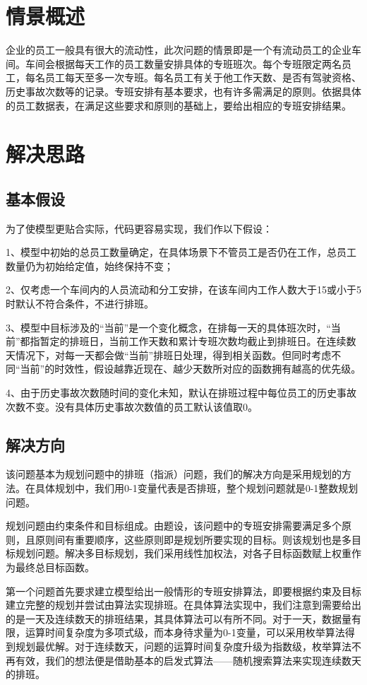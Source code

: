 \documentclass{article}
\begin{document}
	\newpage
	\section{情景概述}
	企业的员工一般具有很大的流动性，此次问题的情景即是一个有流动员工的企业车间。车间会根据每天工作的员工数量安排具体的专班班次。每个专班限定两名员工，每名员工每天至多一次专班。每名员工有关于他工作天数、是否有驾驶资格、历史事故次数等的记录。专班安排有基本要求，也有许多需满足的原则。依据具体的员工数据表，在满足这些要求和原则的基础上，要给出相应的专班安排结果。
	\section{解决思路}
	\subsection{基本假设}
	为了使模型更贴合实际，代码更容易实现，我们作以下假设：
	
	1、模型中初始的总员工数量确定，在具体场景下不管员工是否仍在工作，总员工数量仍为初始给定值，始终保持不变；
	
	2、仅考虑一个车间内的人员流动和分工安排，在该车间内工作人数大于15或小于5时默认不符合条件，不进行排班。
	
	3、模型中目标涉及的“当前”是一个变化概念，在排每一天的具体班次时，“当前”都指暂定的排班日，当前工作天数和累计专班次数均截止到排班日。在连续数天情况下，对每一天都会做“当前”排班日处理，得到相关函数。但同时考虑不同“当前”的时效性，假设越靠近现在、越少天数所对应的函数拥有越高的优先级。
	
	4、由于历史事故次数随时间的变化未知，默认在排班过程中每位员工的历史事故次数不变。没有具体历史事故次数值的员工默认该值取0。
	\subsection{解决方向}
	该问题基本为规划问题中的排班（指派）问题，我们的解决方向是采用规划的方法。在具体规划中，我们用0-1变量代表是否排班，整个规划问题就是0-1整数规划问题。
	
	规划问题由约束条件和目标组成。由题设，该问题中的专班安排需要满足多个原则，且原则间有重要顺序，这些原则即是规划所要实现的目标。则该规划也是多目标规划问题。解决多目标规划，我们采用线性加权法，对各子目标函数赋上权重作为最终总目标函数。
	
	第一个问题首先要求建立模型给出一般情形的专班安排算法，即要根据约束及目标建立完整的规划并尝试由算法实现排班。在具体算法实现中，我们注意到需要给出的是一天及连续数天的排班结果，其具体算法可以有所不同。对于一天，数据量有限，运算时间复杂度为多项式级，而本身待求量为0-1变量，可以采用枚举算法得到规划最优解。对于连续数天，问题的运算时间复杂度升级为指数级，枚举算法不再有效，我们的想法便是借助基本的启发式算法——随机搜索算法来实现连续数天的排班。
	
\end{document}
